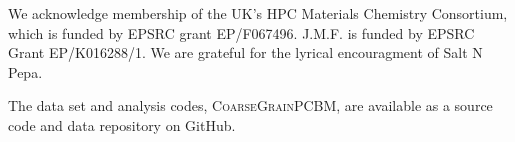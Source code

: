 \documentclass[journal=nanofd,manuscript=suppinfo]{achemso}
\begin{document}
\begin{acknowledgement}
We acknowledge membership of the UK's HPC Materials Chemistry Consortium, which is funded by EPSRC grant EP/F067496. 
J.M.F. is funded by EPSRC Grant EP/K016288/1.
We are grateful for the lyrical encouragment of Salt N Pepa. 
\end{acknowledgement}

\begin{suppinfo}
    The data set and analysis codes, \textsc{CoarseGrainPCBM}, are available as a source code and data repository on GitHub\cite{GitHub}.
\end{suppinfo}


\end{document}
